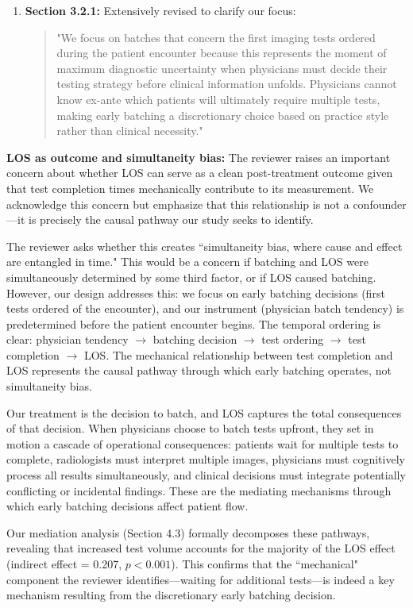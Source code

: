\documentclass[11pt]{article}
\newcommand{\1}{\hbox{\rm 1\kern-.35em 1}}
\begin{document}
{\begin{enumerate}
\item \textbf{Section 3.2.1:} Extensively revised to clarify our focus:
\begin{quote}
"We focus on batches that concern the first imaging tests ordered during the patient encounter because this represents the moment of maximum diagnostic uncertainty when physicians must decide their testing strategy before clinical information unfolds. Physicians cannot know ex-ante which patients will ultimately require multiple tests, making early batching a discretionary choice based on practice style rather than clinical necessity."
\end{quote}
\end{enumerate}

\textbf{LOS as outcome and simultaneity bias:} The reviewer raises an important concern about whether LOS can serve as a clean post-treatment outcome given that test completion times mechanically contribute to its measurement. We acknowledge this concern but emphasize that this relationship is not a confounder—it is precisely the causal pathway our study seeks to identify.

The reviewer asks whether this creates ``simultaneity bias, where cause and effect are entangled in time." This would be a concern if batching and LOS were simultaneously determined by some third factor, or if LOS caused batching. However, our design addresses this: we focus on early batching decisions (first tests ordered of the encounter), and our instrument (physician batch tendency) is predetermined before the patient encounter begins. The temporal ordering is clear: physician tendency $\rightarrow$ batching decision $\rightarrow$ test ordering $\rightarrow$ test completion $\rightarrow$ LOS. The mechanical relationship between test completion and LOS represents the causal pathway through which early batching operates, not simultaneity bias.

Our treatment is the decision to batch, and LOS captures the total consequences of that decision. When physicians choose to batch tests upfront, they set in motion a cascade of operational consequences: patients wait for multiple tests to complete, radiologists must interpret multiple images, physicians must cognitively process all results simultaneously, and clinical decisions must integrate potentially conflicting or incidental findings. These are the mediating mechanisms through which early batching decisions affect patient flow.

Our mediation analysis (Section 4.3) formally decomposes these pathways, revealing that increased test volume accounts for the majority of the LOS effect (indirect effect = 0.207, $p < 0.001$). This confirms that the ``mechanical" component the reviewer identifies—waiting for additional tests—is indeed a key mechanism resulting from the discretionary early batching decision.

}
\end{document}
